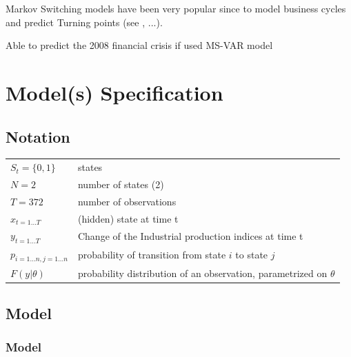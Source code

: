 \documentclass[12pt,a4paper,oneside]{book}
\begin{document}
Markov Switching models have been very popular since \cite{hamilton_new_1989} to model business cycles and predict Turning points (see \cite{duprey_how_2017}, ...).

Able to predict the 2008 financial crisis if used MS-VAR model \cite{gadea_rivas_failure_2015}




\section{Model(s) Specification}

\subsection{Notation}

\begin{tabular}{l l}
    $S_t = \{0, 1\}$&   states        \\
    $N = 2$         &   number of states (2) \\
    $T = 372 $            & 	number of observations  \\
    $x_{t=1\dots T}$ & (hidden) state at time t \\
    $y_{t=1\dots T}$ 	& Change of the Industrial production indices at time t \\
    $p_{i=1\dots n,j=1\dots n}$ & probability of transition from state $i$ to state $j$ \\
    $F(y|\theta )$	&  probability distribution of an observation, parametrized on $\theta$ \\
\end{tabular}



\subsection{Model}

\subsubsection{Model}



\end{document}
